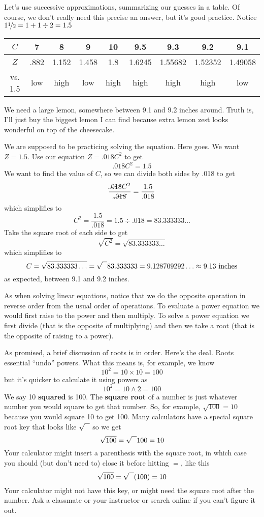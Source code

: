 Let's use successive approximations, summarizing our guesses in a table.  Of course, we don't really need this precise an answer, but it's good practice. Notice $1\nicefrac{1}{2} = 1 + 1 \div 2 = 1.5$
\begin{center}
\begin{tabular} {|c| |c|c |c|c|c|c |c|c|} \hline
$C$ & 7 & 8 & 9 & 10 & 9.5 & 9.3 & 9.2 & 9.1\\ \hline
$Z$ & .882 & 1.152 & 1.458 & 1.8 & 1.6245 & 1.55682 & 1.52352 & 1.49058\\ \hline
vs. 1.5 & low & high & low & high & high & high & high & low\\ \hline
\end{tabular}
\end{center}
We need a large lemon, somewhere between 9.1 and 9.2  inches around.
Truth is, I'll just buy the biggest lemon I can find because extra lemon zest looks wonderful on top of the cheesecake.

We are supposed to be practicing solving the equation.  Here goes.  We want $Z=1.5$.  Use our equation $Z=.018C^2$ to get 
$$.018C^2=1.5$$ 
We want to find the value of $C$, so we can divide both sides by .018 to get 
$$\frac{\cancel{.018}C^2}{\cancel{.018}}=\frac{1.5}{.018}$$  
which simplifies to $$C^2 = \frac{1.5}{.018}= 1.5 \div .018 = 83.333333\ldots$$ 
Take the square root of each side to get
 $$\sqrt{C^2} = \sqrt{83.333333\ldots}$$
 which simplifies to 
$$C = \sqrt{83.333333\ldots} =\sqrt{\text{\raisebox{.6em}{~\text{  }}}} 83.333333
 = 9.128709292\ldots \approx 9.13 \text{ inches}$$  
as expected, between 9.1 and 9.2 inches.  

As when solving linear equations, notice that we do the opposite operation in reverse order from the usual order of operations.  To evaluate a power equation we would first raise to the power and then multiply.  To solve a power equation we first divide (that is the opposite of multiplying) and then we take a root (that is the opposite of raising to a power).

As promised, a brief discussion of roots is in order.  
Here's the deal.  Roots essential ``undo'' powers.  What this means is, for example, we know $$10^2=10 \times 10 =100$$  but it's quicker to calculate it using powers as $$10^2 = 10 \wedge 2 = 100$$  We say 10 \textbf{squared} is 100.  The \textbf{square root} of a number is just whatever number you would square to get that number.  So, for example, $\sqrt{100} = 10$ because you would square 10 to get 100.  Many calculators have a special square root key that looks like $\sqrt{\text{\raisebox{.6em}{~\text{  }}}} $ so we get 
$$\sqrt{100} = \sqrt{\text{\raisebox{.6em}{~\text{  }}}} 100 = 10$$  
Your calculator might insert a parenthesis with the square root, in which case you should (but don't need to) close it before hitting $=$, like this
$$\sqrt{100} = \sqrt{\text{\raisebox{.6em}{~\text{  }}}} ( 100 ) = 10$$ 
Your calculator might not have this key, or might need the square root after the number.  Ask a classmate or your instructor or search online if you can't figure it out.


